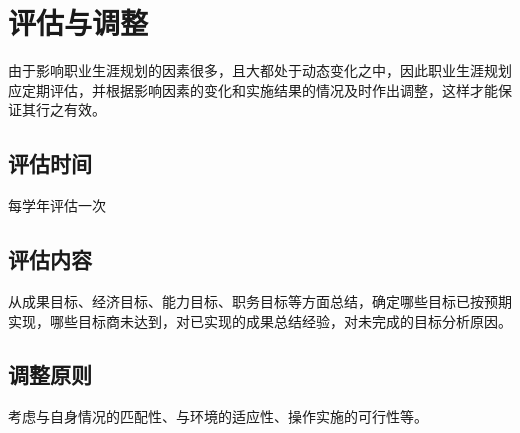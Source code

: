 \documentclass{article}
\begin{document}
	\label{table1}

\section{评估与调整}
由于影响职业生涯规划的因素很多，且大都处于动态变化之中，因此职业生涯规划应定期评估，并根据影响因素的变化和实施结果的情况及时作出调整，这样才能保证其行之有效。\par 
\subsection{评估时间}
每学年评估一次\par
\subsection{评估内容}
从成果目标、经济目标、能力目标、职务目标等方面总结，确定哪些目标已按预期实现，哪些目标商未达到，对已实现的成果总结经验，对未完成的目标分析原因。\par
\subsection{调整原则}
考虑与自身情况的匹配性、与环境的适应性、操作实施的可行性等。\par
\end{document}
